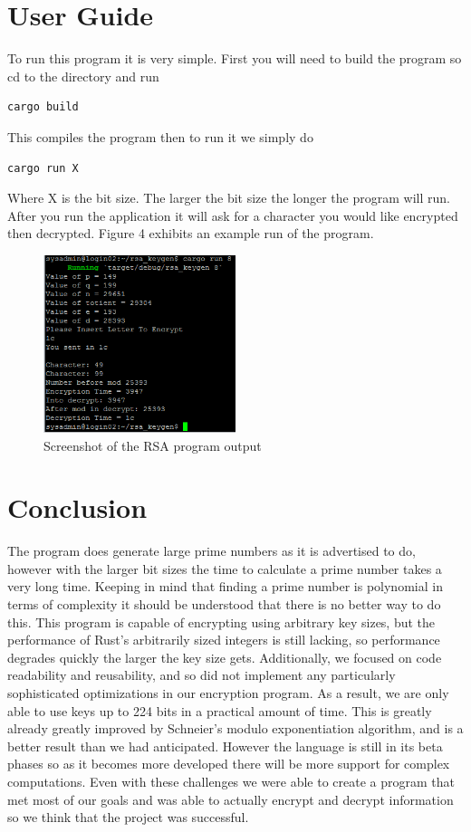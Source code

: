 \documentclass[12pt,technote]{IEEEtran}
\begin{document}
\section{User Guide}
To run this program it is very simple. First you will need to build the program 
so cd to the directory and run 
\begin{lstlisting}[basicstyle=\small]
cargo build
\end{lstlisting} 
This compiles the program then to run it we simply do 
\begin{lstlisting}[basicstyle=\small]
cargo run X 
\end{lstlisting}
Where X is the bit size. The larger the bit size the longer the program will 
run. After you run the application it will ask for a character you would like 
encrypted then decrypted. Figure 4 exhibits an example run of the program.
\begin{figure}
	\begin{center}
		\includegraphics[width=0.5\textwidth]{Capture.PNG}
		\caption{Screenshot of the RSA program output}
	\end{center}
\end{figure}


\section{Conclusion}
The program does generate large prime numbers as it is advertised to do, however 
with the larger bit sizes the time to calculate a prime number takes a very long 
time. Keeping in mind that finding a prime number is polynomial in terms of 
complexity it should be understood that there is no better way to do this. This 
program is capable of encrypting using arbitrary key sizes, but the performance
of Rust's arbitrarily sized integers is still lacking, so performance degrades
quickly the larger the key size gets. Additionally, we focused on code
readability and reusability, and so did not implement any particularly
sophisticated optimizations in our encryption program. As a result, we are only
able to use keys up to 224 bits in a practical amount of time. This is greatly
already greatly improved by Schneier's modulo exponentiation algorithm, and is a
better result than we had anticipated. However the language is still in its beta 
phases so as it becomes more developed there will be more support for complex 
computations. Even with these challenges we were able to create a program that 
met most of our goals and was able to actually encrypt and decrypt information 
so we think that the project was successful.
\cite{sonsec}


\end{document}

